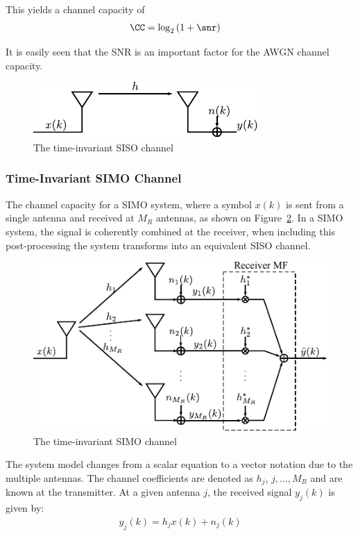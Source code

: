 This yields a channel capacity of\cite{Tim2012Practical} 
\begin{align*}
      \CC &= \log_2 \left( 1 + \snr \right)
\end{align*}

It is easily seen that the SNR is an important factor for the AWGN channel capacity.
\begin{figure}[hbp]
  \centering
  \includegraphics[scale=1.2]{img/analysis/sisoModel}
  \caption{The time-invariant SISO channel}
  \label{fig:sisoModel}
\end{figure}


\subsubsection{Time-Invariant SIMO Channel}
The channel capacity for a SIMO system, where a symbol $x(k)$ is sent from a single antenna and received at $M_R$ antennas, as shown on Figure~\ref{fig:simoModel}. In a SIMO system, the signal is coherently combined at the receiver, when including this post-processing the system transforms into an equivalent SISO channel\cite{Tim2012Practical}. 
\begin{figure}[htbp]
  \centering
  \includegraphics[scale=1.2]{img/analysis/simoModel}
  \caption{The time-invariant SIMO channel}
  \label{fig:simoModel}
\end{figure}

The system model changes from a scalar equation to a vector notation due to the multiple antennas. The channel coefficients are denoted as $h_j$, $j,...,M_R$ and are known at the transmitter. At a given antenna $j$, the received signal $y_j(k)$ is given by\cite{Tim2012Practical}: 
\begin{align*}
  y_j(k) = h_j x(k) + n_j(k)
\end{align*}

